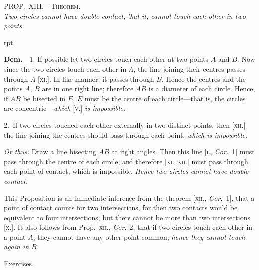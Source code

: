 \documentclass[oneside]{book}
\newcommand\myprop[2]{
\bigskip\Needspace*{4\baselineskip}\begin{center}\textsc{#1}\\\medskip\emph{#2}\par\end{center}
}
\newcommand\exhead[1]{
\Needspace*{5\baselineskip}\begin{center}
\textsf{#1}
\end{center}
}
\newcommand\imgflow[3]{
\setcounter{wrapwidth}{#1}
\begin{wrapfigure}[#2]{r}{\value{wrapwidth}pt}
\begin{center}
\vspace{-0.3in}
\end{center}
\end{wrapfigure}
}
\begin{document}
\myprop{PROP\@.~XIII\@.---Theorem.}{Two circles cannot have double contact, that it, cannot
touch each other in two points.}

\imgflow{120}{9}{f118}

\textbf{Dem.}---1. If possible let two circles touch each
other at two points $A$ and $B$.
Now since the two circles touch
each other in $A$, the line joining
their centres passes through $A$
[\textsc{xi.}]. In like manner, it passes
through $B$. Hence the centres
and the points $A$, $B$ are in one
right line; therefore $AB$ is a
diameter of each circle. Hence,
if $AB$ be bisected in $E$, $E$ must be the centre of each
circle---that is, the circles are concentric---\emph{which} [\textsc{v.}] \emph{is
impossible.}

2.~If two circles touched each other externally in
two distinct points, then [\textsc{xii.}] the line joining the
centres should pass through each point, \emph{which is impossible.}

\emph{Or thus:} Draw a line bisecting $AB$ at right angles.
Then this line [\textsc{i.}, \emph{Cor.}~1]\label{Icor1} must pass through the centre
of each circle, and therefore [\textsc{xi.~xii.}] must pass through
each point of contact, which is impossible. \emph{Hence two
circles cannot have double contact.}\par\medskip

\begin{footnotesize}
This Proposition is an immediate inference from the theorem
[\textsc{xii.}, \emph{Cor.}~1], that a point of contact counts for two intersections,
for then two contacts would be equivalent to four intersections;
but there cannot be more than two intersections [\textsc{x.}]. It also
follows from Prop.~\textsc{xii.}, \emph{Cor.}~2, that if two circles touch each
other in a point $A$, they cannot have any other point common;
\emph{hence they cannot touch again in $B$.}
\par\end{footnotesize}

\exhead{Exercises.}
\end{document}
